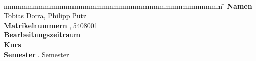 \begin{titlepage}
\begin{center}
		\vspace*{12mm}	{\large\textbf{\arbeit}}\\
        \vspace*{12mm}	\artikelstudiengang{} \studiengang\\
        \vspace*{3mm}   \anderdh{} \dhbw\\
		\vspace*{12mm}	\von\\
		\vspace*{3mm}	{\large\textbf{\autor}}\\
		\vspace*{12mm}	\datumAbgabe\\
	\end{center}
	\vfill
	\begin{spacing}{1.2}
	\begin{tabbing}
		mmmmmmmmmmmmmmmmmmmmmmmmmmmmmmmmmmmmmm  \= \kill
		\textbf{Namen}                          \> Tobias Dorra, Philipp Pütz\\
		\textbf{Matrikelnummern}                , 5408001\\
		\textbf{Bearbeitungszeitraum}           \>  \zeitraum\\
		\textbf{Kurs}               			\>  \kurs\\ %
		\textbf{Semester}                       . Semester\\
	\end{tabbing}
	\end{spacing}
\end{titlepage}
